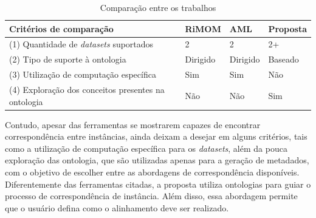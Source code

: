 \begin{table}[h]
	\centering
	\caption{Comparação entre os trabalhos}
	\label{tab:comparacao}
	\begin{tabular}{@{}llll}
		\toprule
		\textbf{Critérios de comparação}                    & \textbf{RiMOM} & \textbf{AML} & \textbf{Proposta} \\ \midrule
		(1) Quantidade de \textit{datasets} suportados    & 2              & 2            & 2+                \\
% 
% 
% 
% 
		(2) Tipo de suporte à ontologia                     & Dirigido       & Dirigido     & Baseado           \\
% 
% 
		(3) Utilização de computação específica             & Sim            & Sim          & Não               \\
		(4) Exploração dos conceitos presentes na ontologia & Não            & Não          & Sim               \\ \bottomrule
	\end{tabular}
\end{table}

Contudo, apesar das ferramentas se mostrarem capazes de encontrar correspondência entre instâncias, ainda deixam a desejar em alguns critérios, tais como a utilização de computação específica para os \textit{datasets}, além da pouca exploração das ontologia, que são utilizadas apenas para a geração de metadados, com o objetivo de escolher entre as abordagens de correspondência disponíveis. Diferentemente das ferramentas citadas, a proposta utiliza ontologias para guiar o processo de correspondência de instância. Além disso, essa abordagem permite que o usuário defina como o alinhamento deve ser realizado.

